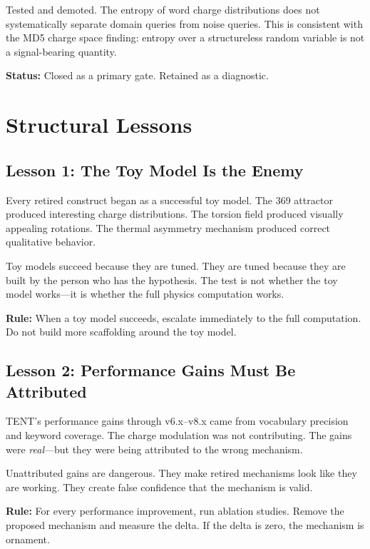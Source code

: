 \documentclass[11pt]{article}
\begin{document}
Tested and demoted. The entropy of word charge distributions does not systematically separate domain queries from noise queries. This is consistent with the MD5 charge space finding: entropy over a structureless random variable is not a signal-bearing quantity.

\textbf{Status:} Closed as a primary gate. Retained as a diagnostic.

\section{Structural Lessons}
\label{sec:lessons}

\subsection{Lesson 1: The Toy Model Is the Enemy}

Every retired construct began as a successful toy model. The 369 attractor produced interesting charge distributions. The torsion field produced visually appealing rotations. The thermal asymmetry mechanism produced correct qualitative behavior.

Toy models succeed because they are tuned. They are tuned because they are built by the person who has the hypothesis. The test is not whether the toy model works---it is whether the full physics computation works.

\textbf{Rule:} When a toy model succeeds, escalate immediately to the full computation. Do not build more scaffolding around the toy model.

\subsection{Lesson 2: Performance Gains Must Be Attributed}

TENT's performance gains through v6.x--v8.x came from vocabulary precision and keyword coverage. The charge modulation was not contributing. The gains were \textit{real}---but they were being attributed to the wrong mechanism.

Unattributed gains are dangerous. They make retired mechanisms look like they are working. They create false confidence that the mechanism is valid.

\textbf{Rule:} For every performance improvement, run ablation studies. Remove the proposed mechanism and measure the delta. If the delta is zero, the mechanism is ornament.
\end{document}
